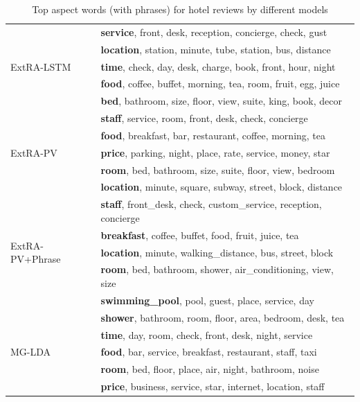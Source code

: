 \begin{table}[th]
\centering
\caption{Top aspect words (with phrases) for hotel reviews by different models}
\label{table:hotel_aspect_words}
\begin{tabular}{|l|l|} \hline
\multirow{5}{*}{ExtRA-LSTM}
& \textbf{service}, front, desk, reception, concierge, check, gust \\
& \textbf{location}, station, minute, tube, station, bus, distance \\
& \textbf{time}, check, day, desk, charge, book, front, hour, night \\
& \textbf{food}, coffee, buffet, morning, tea, room, fruit, egg, juice \\
& \textbf{bed}, bathroom, size, floor, view, suite, king, book, decor \\ \hline

\multirow{5}{*}{ExtRA-PV}
& \textbf {staff}, service, room, front, desk, check, concierge \\
& \textbf {food}, breakfast, bar, restaurant, coffee, morning, tea \\
& \textbf {price}, parking, night, place, rate, service, money, star \\
& \textbf {room}, bed, bathroom, size, suite, floor, view, bedroom \\
& \textbf {location}, minute, square, subway, street, block, distance \\\hline

\multirow{5}{*}{ExtRA-PV+Phrase}
&  \textbf{staff}, front\_desk, check, custom\_service, reception, concierge \\
&  \textbf{breakfast}, coffee, buffet, food, fruit, juice, tea \\
&  \textbf{location}, minute, walking\_distance, bus, street, block \\
&  \textbf{room}, bed, bathroom, shower, air\_conditioning, view, size \\
&  \textbf{swimming\_pool}, pool, guest, place, service, day \\\hline

\multirow{5}{*}{MG-LDA}
& \textbf{shower}, bathroom, room, floor, area, bedroom, desk, tea \\
& \textbf{time}, day, room, check, front, desk, night, service \\
& \textbf{food}, bar, service, breakfast, restaurant, staff, taxi \\
& \textbf{room}, bed, floor, place, air, night, bathroom, noise \\
& \textbf{price}, business, service, star, internet, location, staff \\\hline


\end{tabular}
\end{table}
